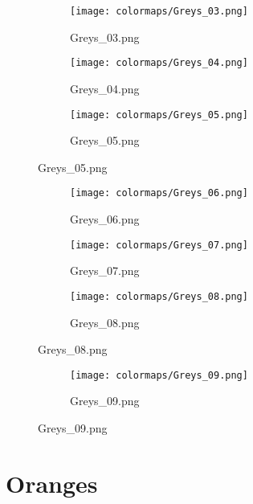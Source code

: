\documentclass{article}%
\begin{document}
\begin{figure}[h!]%
\begin{subfigure}[b]{0.3\linewidth}%
\texttt{[image: colormaps/Greys\_03.png]}%
\caption{Greys\_03.png}%
\end{subfigure}%
\begin{subfigure}[b]{0.3\linewidth}%
\texttt{[image: colormaps/Greys\_04.png]}%
\caption{Greys\_04.png}%
\end{subfigure}%
\begin{subfigure}[b]{0.3\linewidth}%
\texttt{[image: colormaps/Greys\_05.png]}%
\caption{Greys\_05.png}%
\end{subfigure}%
\end{figure}

%
\hspace{1cm}\hfill%
\hspace{1cm}\hfill%
\hspace{1cm}\hfill%


\begin{figure}[h!]%
\begin{subfigure}[b]{0.3\linewidth}%
\texttt{[image: colormaps/Greys\_06.png]}%
\caption{Greys\_06.png}%
\end{subfigure}%
\begin{subfigure}[b]{0.3\linewidth}%
\texttt{[image: colormaps/Greys\_07.png]}%
\caption{Greys\_07.png}%
\end{subfigure}%
\begin{subfigure}[b]{0.3\linewidth}%
\texttt{[image: colormaps/Greys\_08.png]}%
\caption{Greys\_08.png}%
\end{subfigure}%
\end{figure}

%
\hspace{1cm}\hfill%


\begin{figure}[h!]%
\begin{subfigure}[b]{0.3\linewidth}%
\texttt{[image: colormaps/Greys\_09.png]}%
\caption{Greys\_09.png}%
\end{subfigure}%
\end{figure}

%
\newpage%
\section{Oranges}%
\label{sec:Oranges}%
\hspace{1cm}\hfill%
\hspace{1cm}\hfill%
\hspace{1cm}\hfill%
\end{document}
